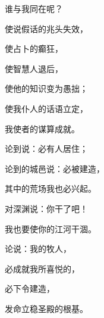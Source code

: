 {\par }{\Q 谁与我同在呢？
\par }{\Q {}使说假话的兆头失效，
\par }{\Q 使占卜的癫狂，
\par }{\Q 使智慧人退后，
\par }{\Q 使他的知识变为愚拙；
\par }{\Q {}使我仆人的话语立定，
\par }{\Q 我使者的谋算成就。
\par }{\Q 论到{}说：必有人居住；
\par }{\Q 论到{}的城邑说：必被建造，
\par }{\Q 其中的荒场我也必兴起。
\par }{\Q {}对深渊说：你干了吧！
\par }{\Q 我也要使你的江河干涸。
\par }{\Q {}论{}说：{}我的牧人，
\par }{\Q 必成就我所喜悦的，
\par }{\Q 必下令建造{}，
\par }{\Q 发命立稳圣殿的根基。

}
